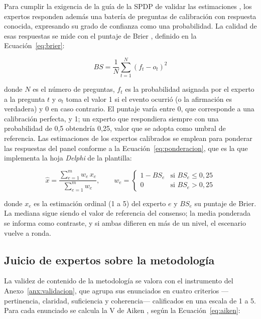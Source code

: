Para cumplir la exigencia de la guía de la SPDP de validar las estimaciones \cite{spdp2026guiav2}, los expertos responden además una batería de preguntas de calibración con respuesta conocida, expresando su grado de confianza como una probabilidad. La calidad de esas respuestas se mide con el puntaje de Brier \cite{brier1950verification}, definido en la Ecuación~\ref{eq:brier}:

\begin{equation}
\label{eq:brier}
BS = \frac{1}{N} \sum_{t=1}^{N} \left( f_t - o_t \right)^2
\end{equation}

\noindent donde $N$ es el número de preguntas, $f_t$ es la probabilidad asignada por el experto a la pregunta $t$ y $o_t$ toma el valor 1 si el evento ocurrió (o la afirmación es verdadera) y 0 en caso contrario. El puntaje varía entre 0, que corresponde a una calibración perfecta, y 1; un experto que respondiera siempre con una probabilidad de 0,5 obtendría 0,25, valor que se adopta como umbral de referencia. Las estimaciones de los expertos calibrados se emplean para ponderar las respuestas del panel conforme a la Ecuación~\ref{eq:ponderacion}, que es la que implementa la hoja \textit{Delphi} de la plantilla:

\begin{equation}
\label{eq:ponderacion}
\hat{x} = \frac{\sum_{e=1}^{m} w_e\, x_e}{\sum_{e=1}^{m} w_e}, \qquad
w_e = \begin{cases} 1 - BS_e & \text{si } BS_e \le 0{,}25 \\ 0 & \text{si } BS_e > 0{,}25 \end{cases}
\end{equation}

\noindent donde $x_e$ es la estimación ordinal (1 a 5) del experto $e$ y $BS_e$ su puntaje de Brier. La mediana sigue siendo el valor de referencia del consenso; la media ponderada se informa como contraste, y si ambas difieren en más de un nivel, el escenario vuelve a ronda.

\subsection{Juicio de expertos sobre la metodología}

La validez de contenido de la metodología se valora con el instrumento del Anexo~\ref{anx:validacion}, que agrupa sus enunciados en cuatro criterios ---pertinencia, claridad, suficiencia y coherencia--- calificados en una escala de 1 a 5. Para cada enunciado se calcula la V de Aiken \cite{aiken1985three}, según la Ecuación~\ref{eq:aiken}:

